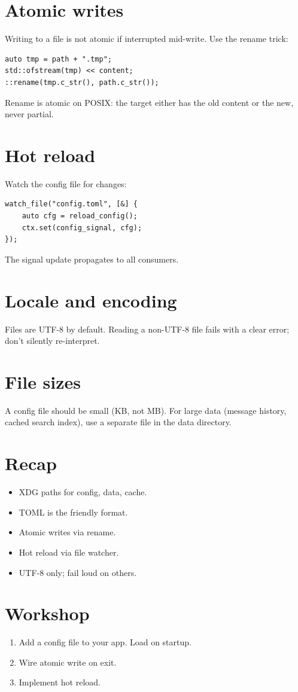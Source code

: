 \section{Atomic writes}

Writing to a file is not atomic if interrupted mid-write.
Use the rename trick:

\begin{lstlisting}
auto tmp = path + ".tmp";
std::ofstream(tmp) << content;
::rename(tmp.c_str(), path.c_str());
\end{lstlisting}

Rename is atomic on POSIX: the target either has the old
content or the new, never partial.

\section{Hot reload}

Watch the config file for changes:

\begin{lstlisting}
watch_file("config.toml", [&] {
    auto cfg = reload_config();
    ctx.set(config_signal, cfg);
});
\end{lstlisting}

The signal update propagates to all consumers.

\section{Locale and encoding}

Files are UTF-8 by default. Reading a non-UTF-8 file fails
with a clear error; don't silently re-interpret.

\section{File sizes}

A config file should be small (KB, not MB). For large data
(message history, cached search index), use a separate file
in the data directory.

\section{Recap}

\begin{recap}
\begin{itemize}[leftmargin=*]
  \item XDG paths for config, data, cache.
  \item TOML is the friendly format.
  \item Atomic writes via rename.
  \item Hot reload via file watcher.
  \item UTF-8 only; fail loud on others.
\end{itemize}
\end{recap}

\section*{Workshop}

\begin{enumerate}[leftmargin=*]
  \item Add a config file to your app. Load on startup.
  \item Wire atomic write on exit.
  \item Implement hot reload.
\end{enumerate}
